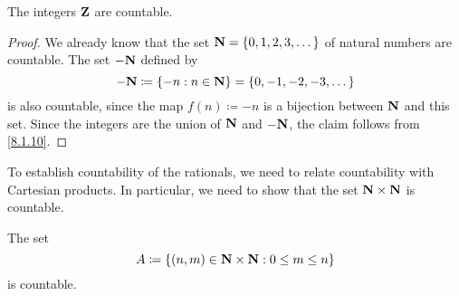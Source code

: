 \begin{corollary}\label{8.1.11}
  The integers \(\mathbf{Z}\) are countable.
\end{corollary}

\begin{proof}
  We already know that the set \(\mathbf{N} = \{0, 1, 2, 3, \dots\}\) of natural numbers are countable.
  The set \(-\mathbf{N}\) defined by
  \[
    -\mathbf{N} \coloneqq \{-n : n \in \mathbf{N}\} = \{0, -1, -2, -3, \dots\}
  \]
  is also countable, since the map \(f(n) \coloneqq -n\) is a bijection between \(\mathbf{N}\) and this set.
  Since the integers are the union of \(\mathbf{N}\) and \(-\mathbf{N}\), the claim follows from \cref{8.1.10}.
\end{proof}

\begin{note}
  To establish countability of the rationals, we need to relate countability with Cartesian products.
  In particular, we need to show that the set \(\mathbf{N} \times \mathbf{N}\) is countable.
\end{note}

\begin{lemma}\label{8.1.12}
  The set
  \[
    A \coloneqq \{(n, m) \in \mathbf{N} \times \mathbf{N} : 0 \leq m \leq n\}
  \]
  is countable.
\end{lemma}

